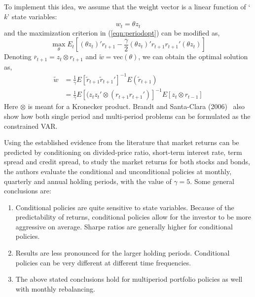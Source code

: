 To implement this idea, we assume that the weight vector is a linear function of `$k$' state variables:
	\begin{equation}\label{eqn:statevar}
	w_t= \theta z_t
	\end{equation}
and the maximization criterion in (\ref{eqn:periodopt}) can be modified as,
	\begin{equation}\label{eqn:prevmodified}
	\max_\theta E_t\left[(\theta z_t)' r_{t+1} - \frac{\gamma}{2}(\theta z_t)' r_{t+1} r_{t+1}' (\theta z_t)\right]
	\end{equation}
Denoting $\overline{r}_{t+1}=z_t \otimes r_{t+1}$ and $\tilde{w}=\text{vec}(\theta)$, we can obtain the optimal solution as,
	\begin{equation}\label{eqn:modifiedsolution}
	\begin{split}
	\tilde{w}&=\frac{1}{\gamma} E[\tilde{r}_{t+1} \tilde{r}_{t+1}']^{-1} E(\tilde{r}_{t+1}) \\
	&=\frac{1}{\gamma} E[(z_t z_t' \otimes (r_{t+1}r_{t+1}')]^{-1} E[z_t \otimes r_{t-1}]
	\end{split}
	\end{equation}
Here $\otimes$ is meant for a Kronecker product. Brandt and Santa-Clara (2006)~\cite{bransc} also show how both single period and multi-period problems can be formulated as the constrained VAR. 


Using the established evidence from the literature that market returns can be predicted by conditioning on divided-price ratio, short-term interest rate, term spread and credit spread, to study the market returns for both stocks and bonds, the authors evaluate the conditional and unconditional policies at monthly, quarterly and annual holding periods, with the value of $\gamma=5$. Some general conclusions are:
	\begin{enumerate}[--]
	\item Conditional policies are quite sensitive to state variables. Because of the predictability of returns, conditional policies allow for the investor to be more aggressive on average. Sharpe ratios are generally higher for conditional policies.
	\item Results are less pronounced for the larger holding periods. Conditional policies can be very different at different time frequencies.
	\item The above stated conclusions hold for multiperiod portfolio policies as well with monthly rebalancing. 
	\end{enumerate}


